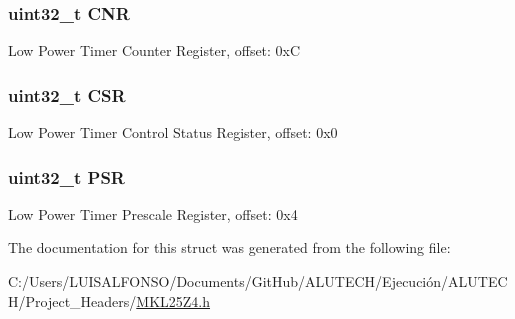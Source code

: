 \subsubsection[{C\+N\+R}]{\setlength{\rightskip}{0pt plus 5cm}uint32\+\_\+t C\+N\+R}\label{struct_l_p_t_m_r___mem_map_a2077b5eef950a2fc28defcc74f06a6c0}
Low Power Timer Counter Register, offset\+: 0x\+C \hypertarget{struct_l_p_t_m_r___mem_map_a9f762945117456968eec12c384b1b4e1}{}
\subsubsection[{C\+S\+R}]{\setlength{\rightskip}{0pt plus 5cm}uint32\+\_\+t C\+S\+R}\label{struct_l_p_t_m_r___mem_map_a9f762945117456968eec12c384b1b4e1}
Low Power Timer Control Status Register, offset\+: 0x0 \hypertarget{struct_l_p_t_m_r___mem_map_a72127a2e703db8406742669d5cbd7f90}{}
\subsubsection[{P\+S\+R}]{\setlength{\rightskip}{0pt plus 5cm}uint32\+\_\+t P\+S\+R}\label{struct_l_p_t_m_r___mem_map_a72127a2e703db8406742669d5cbd7f90}
Low Power Timer Prescale Register, offset\+: 0x4 

The documentation for this struct was generated from the following file\+:\begin{DoxyCompactItemize}
\item 
C\+:/\+Users/\+L\+U\+I\+S\+A\+L\+F\+O\+N\+S\+O/\+Documents/\+Git\+Hub/\+A\+L\+U\+T\+E\+C\+H/\+Ejecución/\+A\+L\+U\+T\+E\+C\+H/\+Project\+\_\+\+Headers/\hyperlink{_m_k_l25_z4_8h}{M\+K\+L25\+Z4.\+h}\end{DoxyCompactItemize}
